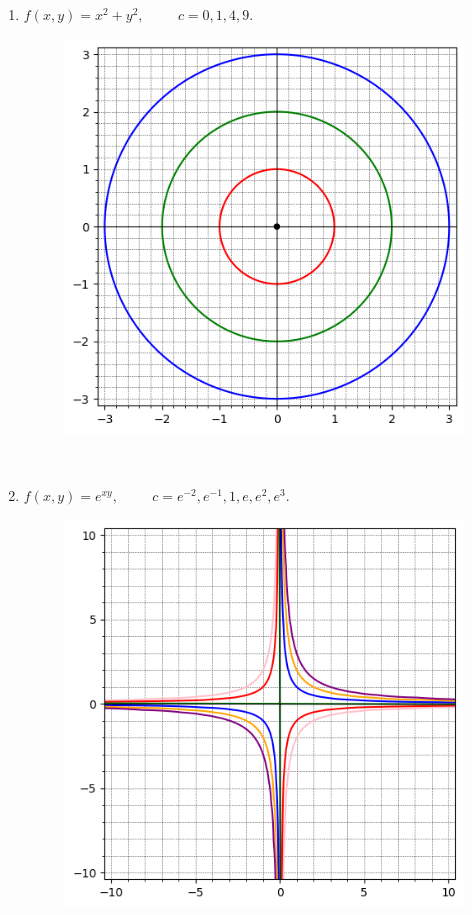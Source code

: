 \documentclass{article}
\begin{document}
\begin{enumerate}
\begin{enumerate}[label=1.\arabic*.]
        \begin{enumerate}[label=(\alph*)]
            \item $f(x, y) = x^2 + y^2, \hspace{1cm} c = 0, 1, 4, 9.$
            \begin{figure}[!ht]
                \centering 
                \includegraphics[width=0.7\linewidth]{imgs/nivel1.png} 
                \label{fig:imagem1}
            \end{figure} \\
            \item $f(x, y) = e^{xy}, \hspace{1cm} c = e^{-2}, e^{-1}, 1, e, e^2, e^3.$
            \begin{figure}[!ht]
                \centering 
                \includegraphics[width=0.7\linewidth]{imgs/nivel2.png} 

\end{figure}
\end{enumerate}
\end{enumerate}
\end{enumerate}
\end{document}
